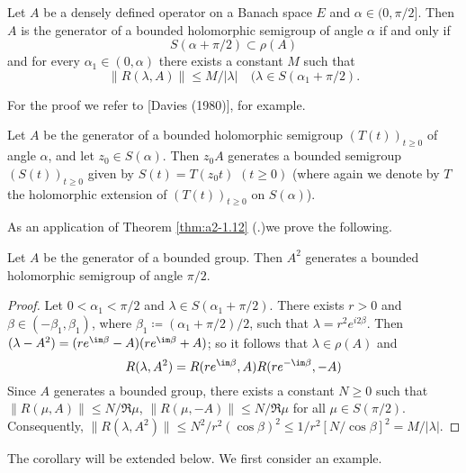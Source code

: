 \begin{theorem}\label{thm:a2-1.12}
Let $A$ be a densely defined operator on a Banach space $E$ and $\alpha \in (0,\pi/2]$.
Then $A$ is the generator of a bounded holomorphic semigroup of angle $\alpha$ if and only if 
\[
S(\alpha + \pi/2) \subset \rho(A)
\]
and for every $\alpha_{1} \in (0,\alpha)$ there exists a constant $M$ such that
\begin{equation}\label{eq:a2-1.6}
    \|R(\lambda,A)\| \leq M/|\lambda| \quad (\lambda \in S(\alpha_{1} + \pi/2) .
\end{equation}
\end{theorem}
For the proof we refer to [Davies (1980)], for example.

\begin{remark*}\label{rem:a2-1.6-kgk}
Let $A$ be the generator of a bounded holomorphic semigroup $(T(t))_{t \geq 0}$ 
of angle $\alpha$, and let $z_{0} \in S(\alpha)$.
Then $z_{0}A$ generates a bounded semigroup 
$(S(t))_{t \geq 0}$ given by $S(t) = T(z_{0}t)$  $(t \geq 0)$ (where again we denote by $T$ the holomorphic extension of $(T(t))_{t \geq 0}$ on $S(\alpha)$).
\end{remark*}
As an application of Theorem \ref{thm:a2-1.12} (.)we prove the following.
\begin{corollary}\label{cor:a2-1.13}
Let $A$ be the generator of a bounded group.
Then $A^{2}$ generates a bounded holomorphic semigroup of angle $\pi/2$.
\end{corollary}
\begin{proof}
Let $0 < \alpha_{1} < \pi/2$ and $\lambda \in S(\alpha_{1} + \pi/2)$.
There exists $r > 0$ and $\beta \in (-\beta_{1},\beta_{1})$,
where $\beta_{1} \coloneqq (\alpha_{1} + \pi/2)/2$,
such that $\lambda = r^{2}e^{i2\beta}$.
Then $(\lambda - A^{2}) = (re^{\im\beta} - A)(re^{\im\beta} + A) $; 
so it follows that $\lambda \in \rho(A)$ and 
\begin{equation}\label{eq:a2-1.7}
    R(\lambda,A^{2}) = R(re^{\im\beta},A)R(re^{-\im\beta},-A)
\end{equation}
Since $A$ generates a bounded group, there exists a constant $N \geq 0$ such that 
$\|R(\mu,A)\| \leq N/\Re\mu$, $\|R(\mu,-A)\| \leq N/\Re\mu$ for all $\mu \in S(\pi/2)$.
Consequently, $\|R(\lambda,A^{2})\| \leq N^{2}/r^{2}(\cos\beta)^{2} \leq 1/r^{2}[N/\cos\beta]^{2} = M/|\lambda|$.
\end{proof}
The corollary will be extended below.
We first consider an example.
